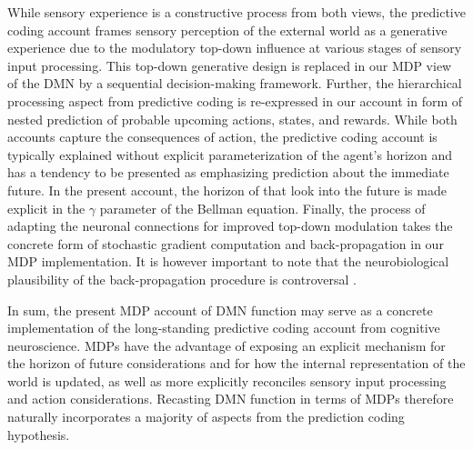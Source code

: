 \documentclass[10pt,letterpaper]{article}
\newcommand{\suggestremove}[1]{{\color{red} \sout{#1}}}
\begin{document}
While sensory experience is a constructive process from both views,
the predictive coding account frames
sensory perception of the external world
as a generative experience due to the modulatory top-down influence at
various stages of sensory input processing.
This top-down generative design is replaced in our MDP view of the DMN
by a sequential decision-making framework.
Further,
the hierarchical processing aspect from predictive coding
is re-expressed in our account in form of
nested prediction of probable upcoming actions, states, and rewards.
While both accounts capture the consequences of action,
the predictive coding account is typically explained without
explicit parameterization of the agent's horizon and
has a tendency to be presented as emphasizing prediction about the
immediate future.
In the present account, the horizon of that
look into the future is made explicit in the $\gamma$ parameter
of the Bellman equation.
Finally,
the process of adapting the neuronal connections
for improved top-down modulation
takes the concrete form of stochastic gradient computation and
back-propagation in our MDP implementation.
It is however important to note that
the neurobiological plausibility of
the back-propagation procedure is controversal
\citep{goodfellow2016deep}.


In sum,
the present MDP account of DMN function may serve as a concrete implementation of
the long-standing predictive coding account from cognitive neuroscience.
MDPs have the advantage of exposing an explicit
mechanism for the horizon of future considerations and for
how the internal representation of the world is updated,
as well as
more explicitly reconciles sensory input processing and action considerations.
%
Recasting DMN function in terms of MDPs therefore naturally incorporates
a majority of aspects from the prediction coding hypothesis.
\end{document}
